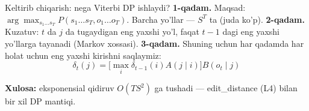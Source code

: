 \documentclass[aspectratio=169,11pt]{beamer}
\begin{document}
\begin{frame}{Keltirib chiqarish: nega Viterbi DP ishlaydi?}
  \textbf{1-qadam.} Maqsad: $\arg\max_{s_1\ldots s_T} P(s_1\ldots s_T, o_1\ldots o_T)$.
  Barcha yo'llar --- $S^T$ ta (juda ko'p).
  \pause
  \textbf{2-qadam.} Kuzatuv: $t$ da $j$ da tugaydigan eng yaxshi yo'l, faqat
  $t{-}1$ dagi eng yaxshi yo'llarga tayanadi (Markov xossasi).
  \pause
  \textbf{3-qadam.} Shuning uchun har qadamda har holat uchun eng yaxshi
  kirishni saqlaymiz:
  $$ \delta_t(j) = \big[\max_i \delta_{t-1}(i) A(j\mid i)\big] B(o_t\mid j) $$
  \begin{tcolorbox}[okbox,top=2pt,bottom=2pt]
    \small \textbf{Xulosa:} eksponensial qidiruv $O(T S^2)$ ga tushadi ---
    edit\_distance (L4) bilan bir xil DP mantiqi.
  \end{tcolorbox}
\end{frame}
\end{document}
